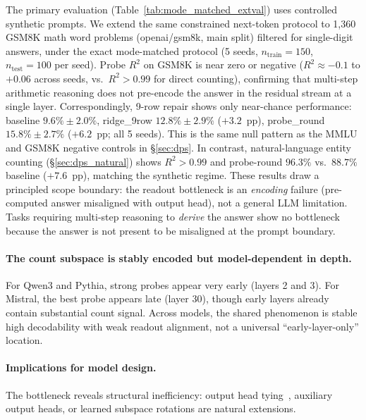 \documentclass{article}
\begin{document}
The primary evaluation (Table~\ref{tab:mode_matched_extval}) uses controlled synthetic prompts.
We extend the same constrained next-token protocol to 1,360 GSM8K math word problems
(openai/gsm8k, main split) filtered for single-digit answers,
under the exact mode-matched protocol (5 seeds, $n_{\text{train}}{=}150$, $n_{\text{test}}{=}100$ per seed).
Probe $R^2$ on GSM8K is near zero or negative ($R^2 \approx -0.1$ to $+0.06$ across seeds,
vs.\ $R^2>0.99$ for direct counting), confirming that multi-step arithmetic reasoning
does not pre-encode the answer in the residual stream at a single layer.
Correspondingly, 9-row repair shows only near-chance performance:
baseline $9.6\%{\pm}2.0\%$, ridge\_9row $12.8\%{\pm}2.9\%$ ($+3.2$~pp),
probe\_round $15.8\%{\pm}2.7\%$ ($+6.2$~pp; all 5 seeds).
This is the same null pattern as the MMLU and GSM8K negative controls in \S\ref{sec:dps}.
In contrast, natural-language entity counting (\S\ref{sec:dps_natural}) shows $R^2>0.99$
and probe-round $96.3\%$ vs.\ $88.7\%$ baseline ($+7.6$~pp), matching the synthetic regime.
These results draw a principled scope boundary: the readout bottleneck is an
\emph{encoding} failure (pre-computed answer misaligned with output head), not a
general LLM limitation. Tasks requiring multi-step reasoning to \emph{derive} the answer
show no bottleneck because the answer is not present to be misaligned at the prompt boundary.

\paragraph{The count subspace is stably encoded but model-dependent in depth.}
For Qwen3 and Pythia, strong probes appear very early (layers 2 and 3).
For Mistral, the best probe appears late (layer 30), though early layers already
contain substantial count signal.
Across models, the shared phenomenon is stable high decodability with weak readout alignment,
not a universal ``early-layer-only'' location.

\paragraph{Implications for model design.}
The bottleneck reveals structural inefficiency: output head tying~\citep{press2017using},
auxiliary output heads, or learned subspace rotations are natural extensions.
\end{document}

